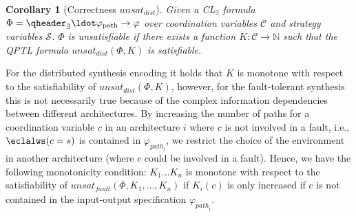 \documentclass{LMCS}
\newcommand{\unsatii}{\mathit{unsat}_\mathit{dist}}
\newcommand{\unsatnf}{\mathit{unsat}_\mathit{fault}}
\theoremstyle{plain}\newtheorem{theorem}[thm]{Theorem}
\theoremstyle{plain}\newtheorem{lemma}[thm]{Lemma}
\theoremstyle{plain}\newtheorem{proposition}[thm]{Proposition}
\theoremstyle{plain}\newtheorem{corollary}[thm]{Corollary}
\theoremstyle{definition}\newtheorem{definition}{Definition}[section]
\begin{document}
\begin{corollary}[Correctness $\unsatii$] \label{thm:correctness_unsatii}
  Given a CL$_\exists$ formula $\Phi = \qheader_\exists \ldot \varphi_{\text{path}} \rightarrow \varphi$ over coordination variables $\mathcal{C}$ and strategy variables $\mathcal{S}$.
  $\Phi$ is unsatisfiable if there exists a function $K : \mathcal{C} \rightarrow \mathbb{N}$ such that the QPTL formula $\unsatii(\Phi,K)$ is satisfiable.
\end{corollary}

\begin{rem}[Monotonicity of $K$]
  For the distributed synthesis encoding it holds that $K$ is monotone with respect to the satisfiability of $\unsatii(\Phi,K)$, however, for the fault-tolerant synthesis this is not necessarily true because of the complex information dependencies between different architectures.
  By increasing the number of paths for a coordination variable $c$ in an architecture $i$ where $c$ is not involved in a fault, i.e., $\eclalws (c = s)$ is contained in $\varphi_{\mathit{path}_i}$, we restrict the choice of the environment in another architecture (where $c$ could be involved in a fault).
  Hence, we have the following monotonicity condition: $K_1 \dots K_n$ is monotone with respect to the satisfiability of $\unsatnf(\Phi,K_1,\dots,K_n)$ if $K_i(c)$ is only increased if $c$ is not contained in the input-output specification $\varphi_{\mathit{path}_i}$.
\end{rem}
\end{document}
